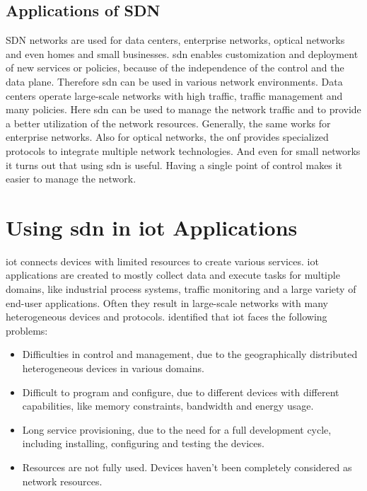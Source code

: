 \documentclass[conference]{IEEEtran}
\begin{document}
	\subsection{Applications of SDN}

	SDN networks are used for data centers, enterprise networks, optical networks and even homes and small businesses. \ac{sdn} enables customization and deployment of new services or policies, because of the independence of the control and the data plane. Therefore \ac{sdn} can be used in various network environments. Data centers operate large-scale networks with high traffic, traffic management and many policies. Here \ac{sdn} can be used to manage the network traffic and to provide a better utilization of the network resources. Generally, the same works for enterprise networks. Also for optical networks, the \ac{onf} provides specialized protocols to integrate multiple network technologies. And even for small networks it turns out that using \ac{sdn} is useful. Having a single point of control makes it easier to manage the network. \cite{Jefia2018-pj} 



	\section{Using \ac{sdn} in \ac{iot} Applications}
	\label{sec:sdn-iot}

	\acf{iot} connects devices with limited resources to create various services. \ac{iot} applications are created to mostly collect data and execute tasks for multiple domains, like industrial process systems, traffic monitoring and a large variety  of end-user applications. Often they result in large-scale networks with many heterogeneous devices and protocols. \cite{Li2020-lx} \citeauthor{Li2020-lx} identified that \ac{iot} faces the following problems: 

	\begin{itemize}
		\item Difficulties in control and management, due to the geographically distributed heterogeneous devices in various domains.
		\item Difficult to program and configure, due to different devices with different capabilities, like memory constraints, bandwidth and energy usage.
		\item Long service provisioning, due to the need for a full development cycle, including installing, configuring and testing the devices. 
		\item Resources are not fully used. Devices haven't been completely considered as network resources. \cite{Sahrish2017}
	\end{itemize}
\end{document}
